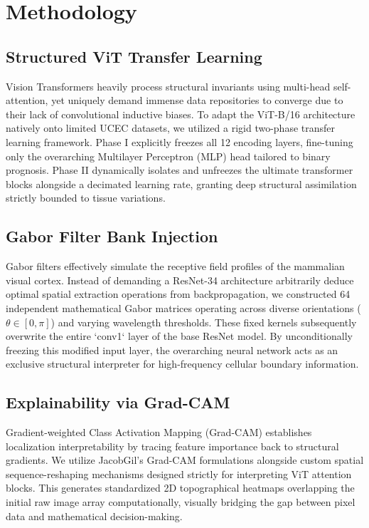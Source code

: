 \documentclass[conference]{IEEEtran}
\begin{document}
\section{Methodology}

\subsection{Structured ViT Transfer Learning}
Vision Transformers heavily process structural invariants using multi-head self-attention, yet uniquely demand immense data repositories to converge due to their lack of convolutional inductive biases. To adapt the ViT-B/16 architecture natively onto limited UCEC datasets, we utilized a rigid two-phase transfer learning framework. Phase I explicitly freezes all 12 encoding layers, fine-tuning only the overarching Multilayer Perceptron (MLP) head tailored to binary prognosis. Phase II dynamically isolates and unfreezes the ultimate transformer blocks alongside a decimated learning rate, granting deep structural assimilation strictly bounded to tissue variations. 

\subsection{Gabor Filter Bank Injection}
Gabor filters effectively simulate the receptive field profiles of the mammalian visual cortex. Instead of demanding a ResNet-34 architecture arbitrarily deduce optimal spatial extraction operations from backpropagation, we constructed 64 independent mathematical Gabor matrices operating across diverse orientations ($\theta \in [0, \pi]$) and varying wavelength thresholds. These fixed kernels subsequently overwrite the entire `conv1` layer of the base ResNet model. By unconditionally freezing this modified input layer, the overarching neural network acts as an exclusive structural interpreter for high-frequency cellular boundary information.

\subsection{Explainability via Grad-CAM}
Gradient-weighted Class Activation Mapping (Grad-CAM) establishes localization interpretability by tracing feature importance back to structural gradients. We utilize JacobGil's Grad-CAM formulations alongside custom spatial sequence-reshaping mechanisms designed strictly for interpreting ViT attention blocks. This generates standardized 2D topographical heatmaps overlapping the initial raw image array computationally, visually bridging the gap between pixel data and mathematical decision-making.
\end{document}
